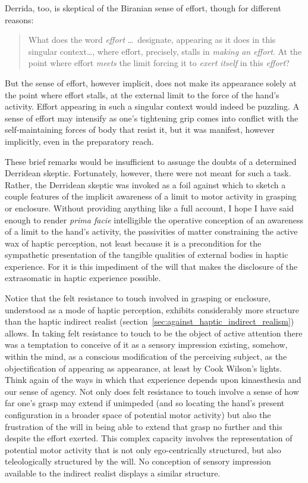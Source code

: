 Derrida, too, is skeptical of the Biranian sense of effort, though for different reasons:
\begin{quote}
	What does the word \emph{effort} \ldots\ designate, appearing as it does in this singular context\ldots, where effort, precisely, stalls in \emph{making an effort}. At the point where effort \emph{meets} the limit forcing it to \emph{exert} \emph{itself} in this \emph{effort}? \citealt[110]{Derrida:2005aa}
\end{quote}
But the sense of effort, however implicit, does not make its appearance solely at the point where effort stalls, at the external limit to the force of the hand's activity. Effort appearing in such a singular context would indeed be puzzling. A sense of effort may intensify as one's tightening grip comes into conflict with the self-maintaining forces of body that resist it, but it was manifest, however implicitly, even in the preparatory reach.

These brief remarks would be insufficient to assuage the doubts of a determined Derridean skeptic. Fortunately, however, there were not meant for such a task. Rather, the Derridean skeptic was invoked as a foil against which to sketch a couple features of the implicit awareness of a limit to motor activity in grasping or enclosure. Without providing anything like a full account, I hope I have said enough to render \emph{prima facie} intelligible the operative conception of an awareness of a limit to the hand's activity, the passivities of matter constraining the active wax of haptic perception, not least because it is a precondition for the sympathetic presentation of the tangible qualities of external bodies in haptic experience. For it is this impediment of the will that makes the disclosure of the extrasomatic in haptic experience possible.

Notice that the felt resistance to touch involved in grasping or enclosure, understood as a mode of haptic perception, exhibits considerably more structure than the haptic indirect realist (section~\ref{sec:against_haptic_indirect_realism}) allows. In taking felt resistance to touch to be the object of active attention there was a temptation to conceive of it as a sensory impression existing, somehow, within the mind, as a conscious modification of the perceiving subject, as the objectification of appearing as appearance, at least by Cook Wilson's lights. Think again of the ways in which that experience depends upon kinaesthesia and our sense of agency. Not only does felt resistance to touch involve a sense of how far one's grasp may extend if unimpeded (and so locating the hand's present configuration in a broader space of potential motor activity) but also the frustration of the will in being able to extend that grasp no further and this despite the effort exerted. This complex capacity involves the representation of potential motor activity that is not only ego-centrically structured, but also teleologically structured by the will. No conception of sensory impression available to the indirect realist displays a similar structure.

